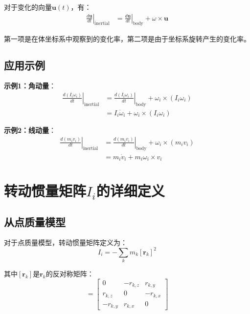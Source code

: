 \documentclass[12pt,a4paper]{article}
\begin{document}
对于变化的向量$\bm{u}(t)$，有：
\begin{align}
\left.\frac{d\bm{u}}{dt}\right|_{\text{inertial}} &= \left.\frac{d\bm{u}}{dt}\right|_{\text{body}} + \omega \times \bm{u}
\end{align}

第一项是在体坐标系中观察到的变化率，第二项是由于坐标系旋转产生的变化率。

\subsection{应用示例}

\textbf{示例1：角动量}：
\begin{align}
\left.\frac{d(I_i \omega_i)}{dt}\right|_{\text{inertial}} &= \left.\frac{d(I_i \omega_i)}{dt}\right|_{\text{body}} + \omega_i \times (I_i \omega_i) \\
&= I_i \dot{\omega}_i + \omega_i \times (I_i \omega_i)
\end{align}

\textbf{示例2：线动量}：
\begin{align}
\left.\frac{d(m_i v_i)}{dt}\right|_{\text{inertial}} &= \left.\frac{d(m_i v_i)}{dt}\right|_{\text{body}} + \omega_i \times (m_i v_i) \\
&= m_i \dot{v}_i + m_i \omega_i \times v_i
\end{align}

\section{转动惯量矩阵$I_i$的详细定义}

\subsection{从点质量模型}

对于点质量模型，转动惯量矩阵定义为：
\begin{equation}
I_i = -\sum_k m_k [\bm{r}_k]^2
\end{equation}

其中$[\bm{r}_k]$是$\bm{r}_k$的反对称矩阵：
\begin{equation}
[\bm{r}_k] = \begin{bmatrix}
0 & -r_{k,z} & r_{k,y} \\
r_{k,z} & 0 & -r_{k,x} \\
-r_{k,y} & r_{k,x} & 0
\end{bmatrix}
\end{equation}
\end{document}
